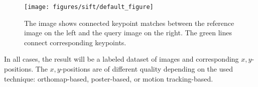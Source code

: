 \begin{figure}[h!]
\begin{center}
\texttt{[image: figures/sift/default\_figure]}
\caption{{\label{fig:homography} The
    image shows connected keypoint matches between the reference image
    on the left and the query image on the right. The green lines
    connect corresponding keypoints.%
}}
\end{center}
\end{figure}

In all cases, the result will be a labeled dataset of images and corresponding $x,y$-positions. The $x,y$-positions are of different quality depending on the used technique: orthomap-based, poster-based, or motion tracking-based. 


